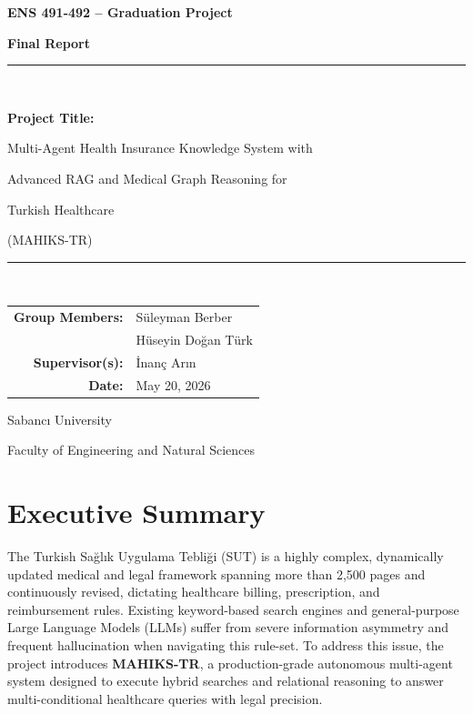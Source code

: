 \documentclass[11pt, a4paper]{article}
\begin{document}
\begin{titlepage}
    \centering
    \vspace*{2cm}
    {\Huge\bfseries ENS 491-492 -- Graduation Project\par}
    \vspace{0.5cm}
    {\Large\bfseries Final Report\par}
    \vspace{2cm}

    \rule{\linewidth}{0.4pt}\\[0.5cm]
    {\LARGE\bfseries Project Title:\par}
    \vspace{0.3cm}
    {\Large Multi-Agent Health Insurance Knowledge System with\par}
    {\Large Advanced RAG and Medical Graph Reasoning for\par}
    {\Large Turkish Healthcare\par}
    \vspace{0.3cm}
    {\large (MAHIKS-TR)\par}
    \rule{\linewidth}{0.4pt}\\[2.5cm]

    \begin{tabular}{rl}
        \large\textbf{Group Members:} & \large Süleyman Berber \\
                                      & \large Hüseyin Doğan Türk \\[0.5cm]
        \large\textbf{Supervisor(s):} & \large İnanç Arın \\[0.5cm]
        \large\textbf{Date:}          & \large May 20, 2026 \\
    \end{tabular}

    \vfill
    {\large Sabancı University\par}
    {\large Faculty of Engineering and Natural Sciences\par}
\end{titlepage}

\tableofcontents
\newpage

\section{Executive Summary}

The Turkish Sağlık Uygulama Tebliği (SUT) is a highly complex, dynamically updated medical and legal framework spanning more than 2{,}500 pages and continuously revised, dictating healthcare billing, prescription, and reimbursement rules. Existing keyword-based search engines and general-purpose Large Language Models (LLMs) suffer from severe information asymmetry and frequent hallucination when navigating this rule-set. To address this issue, the project introduces \textbf{MAHIKS-TR}, a production-grade autonomous multi-agent system designed to execute hybrid searches and relational reasoning to answer multi-conditional healthcare queries with legal precision.
\end{document}
